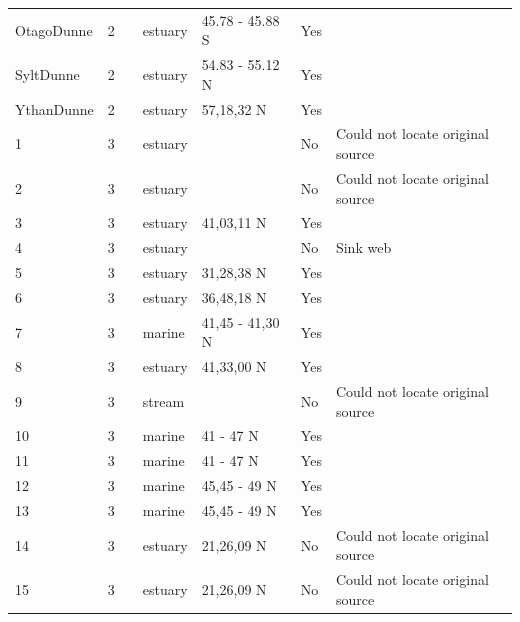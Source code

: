 \documentclass[12pt]{article}
\begin{document}
\begin{landscape}
\begin{table}[h!]
{\begin{tabular}{p{2.8cm}p{1.3cm}p{3cm}p{2.2cm}p{2.5cm}lp{8.2cm}}
        OtagoDunne & 2 & \cite{Mouritsen2011}  & estuary & 45.78 - 45.88 S & Yes   &        \\
        SyltDunne & 2 & \cite{Thieltges2011}  & estuary & 54.83 - 55.12 N & Yes   &        \\
        YthanDunne & 2 & \cite{Huxham1996}  & estuary & 57,18,32 N & Yes   &        \\
        1     & 3 & \cite{Qazim1970}  & estuary &       & No    & Could not locate original source \\
        2     & 3 & \cite{Day1967} & estuary &       & No    & Could not locate original source \\
        3     & 3 & \cite{Woodwell1967}    & estuary & 41,03,11 N & Yes   &       \\
        4     & 3 & \cite{Johnston1956}    & estuary &       & No    & Sink web \\
        5     & 3 & \cite{Teal1962}    & estuary & 31,28,38 N & Yes   &       \\
        6     & 3 & \cite{MacGinitie1935}    & estuary & 36,48,18 N & Yes   &       \\
        7     & 3 & \cite{Kremer1978}    & marine & 41,45 - 41,30 N & Yes   &       \\
        8     & 3 & \cite{Nixon1973}    & estuary & 41,33,00 N & Yes   &       \\
        9     & 3 & \cite{Kitching1967}  & stream &       & No    & Could not locate original source \\
        10    & 3 & \cite{Menge1976}    & marine & 41 - 47 N & Yes   &       \\
        11    & 3 & \cite{Menge1976}    & marine & 41 - 47 N & Yes   &       \\
        12    & 3 & \cite{Menge1976}    & marine & 45,45 - 49 N & Yes   &       \\
        13    & 3 & \cite{Menge1976}    & marine & 45,45 - 49 N & Yes   &       \\
        14    & 3 & \cite{Walsh1967}  & estuary & 21,26,09 N & No    & Could not locate original source \\
        15    & 3 & \cite{Walsh1967}  & estuary & 21,26,09 N & No    & Could not locate original source \\
        \hline
      \end{tabular}}%
      \end{table}

        \newpage


\end{landscape}
\end{document}
